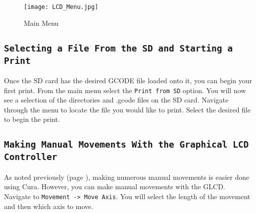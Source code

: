 \begin{figure}[h]
\centering
\texttt{[image: LCD\_Menu.jpg]}
\caption{Main Menu}
\label{fig:main_menu}
\end{figure}



\subsection{\texttt{Selecting a File From the SD and Starting a Print}}
Once the SD card has the desired GCODE file loaded onto it, you can begin your first print. From the main menu select the \texttt{Print from SD} option. You will now see a selection of the directories and .gcode files on the SD card. Navigate through the menu to locate the file you would like to print. Select the desired file to begin the print.


\subsection{\texttt{Making Manual Movements With the Graphical LCD Controller}}
As noted previously (page \pageref{sec:Graphic LCD, Cura or Other Host?}), making numerous manual movements is easier done using Cura. However, you can make manual movements with the GLCD. Navigate to \texttt{Movement -> Move Axis}. You will select the length of the movement and then which axis to move. %

